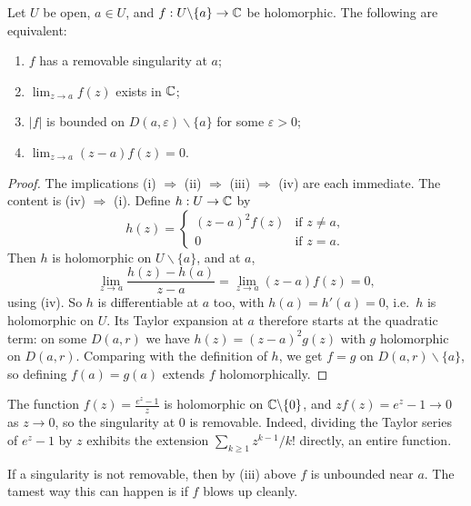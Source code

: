 \documentclass[a4paper]{scrartcl}
\begin{document}
\begin{proposition}
    Let $U$ be open, $a \in U$, and $f: U \backslash \{a\} \rightarrow \mathbb{C}$ be holomorphic. The following are equivalent:
    \begin{enumerate}[label=(\roman*)]
        \item $f$ has a removable singularity at $a$;
        \item $\lim_{z \to a} f(z)$ exists in $\mathbb{C}$;
        \item $|f|$ is bounded on $D(a, \varepsilon) \backslash \{a\}$ for some $\varepsilon > 0$;
        \item $\lim_{z \to a} (z - a)f(z) = 0$.
    \end{enumerate}
\end{proposition}
\begin{proof}
    The implications (i) $\Rightarrow$ (ii) $\Rightarrow$ (iii) $\Rightarrow$ (iv) are each immediate. The content is (iv) $\Rightarrow$ (i). Define $h: U \rightarrow \mathbb{C}$ by
    $$
    h(z) = \begin{cases}
        (z - a)^2 f(z) &\mbox{if } z \neq a, \\
        0 &\mbox{if } z = a.
       \end{cases}
    $$
    Then $h$ is holomorphic on $U \backslash \{a\}$, and at $a$,
    $$
    \lim_{z \to a} \frac{h(z) - h(a)}{z - a} = \lim_{z \to a}(z - a)f(z) = 0,
    $$
    using (iv). So $h$ is differentiable at $a$ too, with $h(a) = h'(a) = 0$, i.e.\ $h$ is holomorphic on $U$. Its Taylor expansion at $a$ therefore starts at the quadratic term: on some $D(a, r)$ we have $h(z) = (z - a)^2 g(z)$ with $g$ holomorphic on $D(a, r)$. Comparing with the definition of $h$, we get $f = g$ on $D(a, r) \backslash \{a\}$, so defining $f(a) = g(a)$ extends $f$ holomorphically.
\end{proof}

\begin{example}
    The function $f(z) = \frac{e^z - 1}{z}$ is holomorphic on $\mathbb{C} \backslash \{0\}$, and $z f(z) = e^z - 1 \rightarrow 0$ as $z \rightarrow 0$, so the singularity at $0$ is removable. Indeed, dividing the Taylor series of $e^z - 1$ by $z$ exhibits the extension $\sum_{k \geq 1} z^{k - 1}/k!$ directly, an entire function.
\end{example}

If a singularity is not removable, then by (iii) above $f$ is unbounded near $a$. The tamest way this can happen is if $f$ blows up cleanly.
\end{document}
